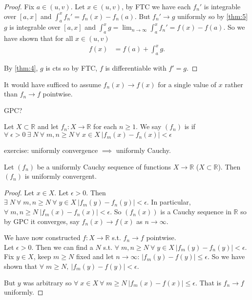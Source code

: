 \begin{proof}
    Fix $a \in (u, v)$.
    Let $x \in (u, v)$, by FTC we have each $f_n'$ is integrable over $[a, x]$ and $\int_{a}^{x} f_n' = f_n(x) - f_n(a)$.
    But $f_n' \to g$ uniformly so by \cref{thm:5} $g$ is integrable over $[a, x]$ and $\int_{a}^{x} g = \lim_{n \to \infty} \int_{a}^{x} f_n' = f(x) - f(a)$.
    So we have shown that for all $x \in (u, v)$
    \begin{align*}
        f(x) &= f(a) + \int_a^x g.
    \end{align*} 

    By \cref{thm:4}, $g$ is cts so by FTC, $f$ is differentiable with $f' = g$.
\end{proof} 

\begin{remark}
    It would have sufficed to assume $f_n(x) \to f(x)$ for a single value of $x$ rather than $f_n \to f$ pointwise.
\end{remark} 

GPC?

\begin{definition}
    Let $X \subset \mathbb{R}$ and let $f_n : X \to \mathbb{R}$ for each $n \geq 1$.
    We say $(f_n)$ is  if $\forall \; \epsilon > 0 \ \exists \; N \ \forall \; m, n \geq N \ \forall \; x \in X \ |f_m(x) - f_n(x)| < \epsilon$
\end{definition} 

exercise: uniformly convergence $\implies$ uniformly Cauchy.

\begin{theorem} \label{thm:7}
    Let $(f_n)$ be a uniformly Cauchy sequence of functions $X \to \mathbb{R}$ ($X \subset \mathbb{R}$).
    Then $(f_n)$ is uniformly convergent.
\end{theorem} 

\begin{proof}
    Let $x \in X$.
    Let $\epsilon > 0$.
    Then $\exists \; N \ \forall \; m,n \geq N \ \forall \; y \in X \ |f_m(y) - f_n(y)| < \epsilon$.
    In particular, $\forall \; m, n \geq N \ |f_m(x) - f_n(x)| < \epsilon$.
    So $(f_n(x))$ is a Cauchy sequence in $\mathbb{R}$ so by GPC it converges, say $f_n(x) \to f(x)$ as $n \to \infty$. 

    We have now constructed $f : X \to \mathbb{R}$ s.t. $f_n \to f$ pointwise. \\
    Let $\epsilon > 0$.
    Then we can find a $N$ s.t. $\forall \; m, n \geq N \ \forall \; y \in X \ |f_m(y) - f_n(y)| < \epsilon$.
    Fix $y \in X$, keep $m \geq N$ fixed and let $n \to \infty$: $|f_m(y) - f(y)| \leq \epsilon$.
    So we have shown that $\forall \; m \geq N,\ |f_m(y) - f(y)| < \epsilon$.

    But $y$ was arbitrary so $\forall \; x \in X \ \forall \; m \geq N \ |f_m(x) - f(x)| \leq \epsilon$.
    That is $f_n \to f$ uniformly.
\end{proof} 

